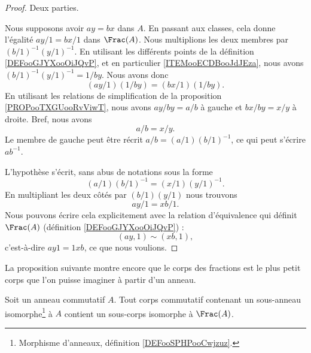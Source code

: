 \begin{proof}
	Deux parties.
	\begin{subproof}
		\spitem[\( \Rightarrow\)]
		Nous supposons avoir \( ay=bx\) dans \( A\). En passant aux classes, cela donne l'égalité \( ay/1=bx/1\) dans \( \Frac(A)\). Nous multiplions les deux membres par \( (b/1)^{-1}(y/1)^{-1}\). En utilisant les différents points de la définition \ref{DEFooGJYXooOiJQvP}, et en particulier \ref{ITEMooECDBooJdJEza}, nous avons\( (b/1)^{-1}(y/1)^{-1}=1/by\). Nous avons donc
		\begin{equation}
			(ay/1)(1/by)=(bx/1)(1/by).
		\end{equation}
		En utilisant les relations de simplification de la proposition \ref{PROPooTXGUooRvViwT}, nous avons \( ay/by=a/b\) à gauche et \( bx/by=x/y\) à droite. Bref, nous avons
		\begin{equation}
			a/b=x/y.
		\end{equation}
		Le membre de gauche peut être récrit \( a/b=(a/1)(b/1)^{-1}\), ce qui peut s'écrire \( ab^{-1}\).
	\end{subproof}

	\spitem[\( \Leftarrow\)]
	L'hypothèse s'écrit, sans abus de notations sous la forme
	\begin{equation}
		(a/1)(b/1)^{-1}=(x/1)(y/1)^{-1}.
	\end{equation}
	En multipliant les deux côtés par \( (b/1)(y/1)\) nous trouvons
	\begin{equation}
		ay/1=xb/1.
	\end{equation}
	Nous pouvons écrire cela explicitement avec la relation d'équivalence qui définit \( \Frac(A)\) (définition \ref{DEFooGJYXooOiJQvP}) :
	\begin{equation}
		(ay,1)\sim (xb,1),
	\end{equation}
	c'est-à-dire \( ay1=1xb\), ce que nous voulions.
\end{proof}

La proposition suivante montre encore que le corps des fractions est le plus petit corps que l'on puisse imaginer à partir d'un anneau.
\begin{proposition}       \label{PROPooIJBEooDjsoHr}
	Soit un anneau commutatif \( A\). Tout corps commutatif contenant un sous-anneau isomorphe\footnote{Morphisme d'anneaux, définition \ref{DEFooSPHPooCwjzuz}.} à \( A\) contient un sous-corps isomorphe à \( \Frac(A)\).
\end{proposition}

